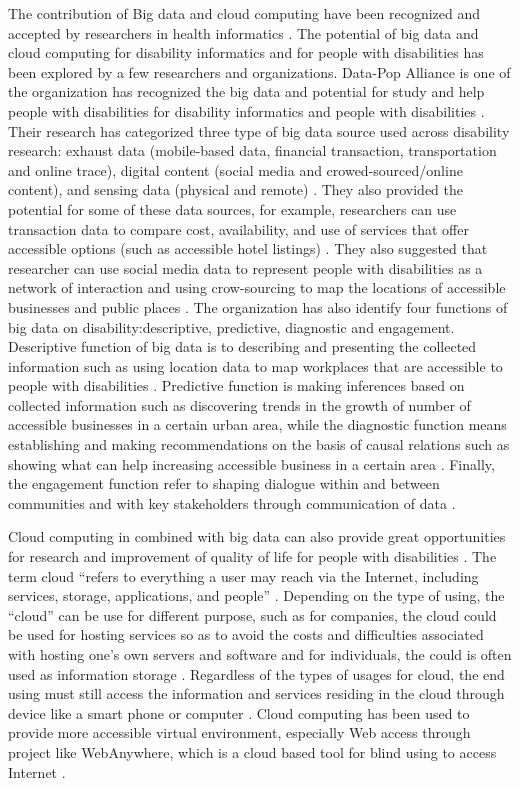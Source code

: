  The contribution of Big data and cloud computing have been recognized and accepted by researchers in health informatics \cite{7047725}. The potential of big data and cloud computing for disability informatics and for people with disabilities has 
been explored by a few researchers and organizations. Data-Pop Alliance is one of the organization has recognized 
the big data and potential for study and help people with disabilities for disability informatics and people 
with disabilities \cite{Datapop}. Their research has categorized three type of big data source used across disability
research: exhaust data (mobile-based data, financial transaction, transportation and online trace), digital 
content (social media and crowed-sourced/online content), and sensing data (physical and remote) \cite{Datapop}. 
They also provided the potential for some of these data sources, for example, researchers can use transaction 
data to compare cost, availability, and use of services that offer accessible options (such as accessible hotel 
listings) \cite{Datapop}. They also suggested that researcher can use social media data to represent people with
disabilities as a network of interaction and using crow-sourcing to map the locations of accessible businesses 
and public places \cite{Datapop}. 
The organization has also identify four functions of big data on disability:descriptive, predictive, diagnostic 
and engagement. Descriptive function of big data is to describing and presenting the collected information such
as using location data to map workplaces that are accessible to people with disabilities \cite{Datapop}. 
Predictive function is making inferences based on collected information such as discovering trends in the 
growth of number of accessible businesses in a certain urban area, while the diagnostic function means
establishing and making recommendations on the basis of causal relations such as showing what can help 
increasing accessible business in a certain area \cite{Datapop}. Finally, the engagement function refer
to shaping dialogue within and between communities and with key stakeholders through communication of data \cite{Datapop}.


Cloud computing in combined with big data can also provide great opportunities for research and improvement of
quality of life for people with disabilities \cite{Caldwell2011}. The term cloud ``refers to everything a user may reach via the 
Internet, including services, storage, applications, and people'' \cite{Hoehl2010}. Depending on the type of 
using, the ``cloud'' can be use for different purpose, such as for companies, the cloud could be used for hosting
services so as to avoid the costs and difficulties associated with hosting one’s own servers and software and for
individuals, the could is often used as information storage \cite{Khazaei14}. Regardless of the types of usages 
for cloud, the end using must still access the information and services residing in the cloud through device like
a smart phone or computer \cite{Hoehl2010}. Cloud computing has been used to provide more accessible virtual 
environment, especially Web access through project like WebAnywhere, which is a cloud based tool for blind using 
to access Internet \cite{Hoehl2010}. 

